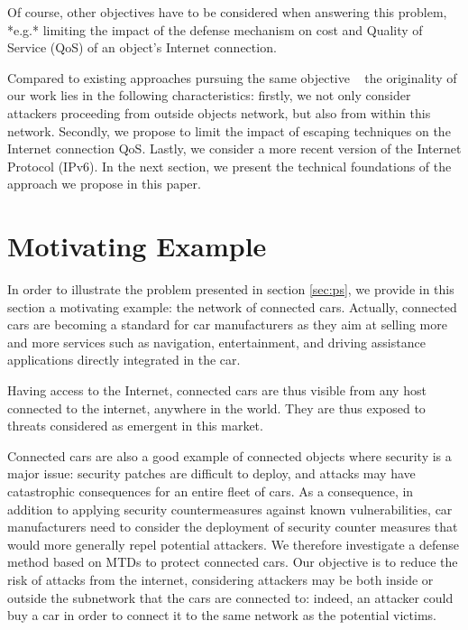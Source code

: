 Of course, other objectives have to be considered when answering this
problem, *e.g.* limiting the impact of the defense mechanism on cost and
Quality of Service (QoS) of an object's Internet connection.

Compared to existing approaches pursuing the same objective
~\cite{antonatos_2007, jia_motag_2013, clark_2013, carroll_2014,fraunholz_catch_2018} the originality of our work
lies in the following characteristics: firstly, we not only consider
attackers proceeding from outside objects network, but also from
within this network. Secondly, we propose to limit the impact of
escaping techniques on the Internet connection QoS. Lastly, we
consider a more recent version of the Internet Protocol (IPv6). In the next
section, we present the technical foundations of the approach we
propose in this paper.


\section{Motivating Example}


\label{sec:motivating_ex}

{\Huge I}n order to illustrate the problem presented in section \ref{sec:ps}, we provide in
this section a motivating example: the network of connected cars. Actually,
connected cars are becoming a standard for car manufacturers as they aim at
selling more and more services such as navigation, entertainment, and driving
assistance applications directly integrated in the car.

Having access to the Internet, connected cars are thus visible from
any host connected to the internet, anywhere in the world. They are
thus exposed to threats considered as emergent in this market.

Connected cars are also a good example of connected objects where security
is a major issue: security patches are difficult to deploy, and
attacks may have catastrophic consequences for an entire fleet of
cars. As a consequence, in addition to applying security
countermeasures against known vulnerabilities, car manufacturers need to
consider the deployment of security counter measures that would
more generally repel potential attackers. We therefore investigate a
defense method based on MTDs to protect connected cars. Our objective is to reduce the risk of attacks
from the internet, considering attackers may be both inside or outside
the subnetwork that the cars are connected to: indeed, an attacker could buy a
car in order to connect it to the same network as the potential victims.

